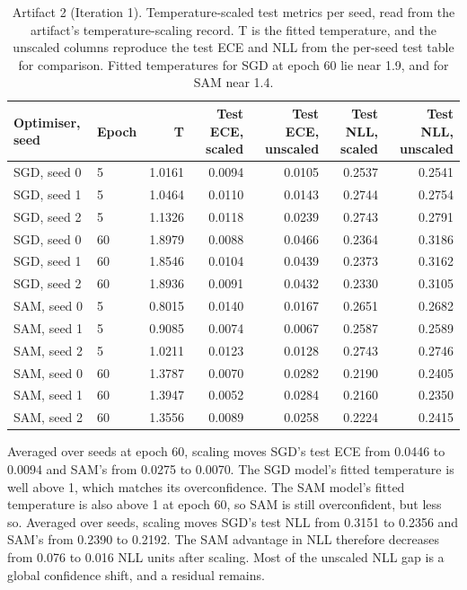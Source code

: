 \documentclass[11pt,letterpaper]{article}
\begin{document}
\begin{table}[!htbp]
\centering
\footnotesize
\caption{Artifact 2 (Iteration 1). Temperature-scaled test metrics per seed, read from the artifact's temperature-scaling record. T is the fitted temperature, and the unscaled columns reproduce the test ECE and NLL from the per-seed test table for comparison. Fitted temperatures for SGD at epoch 60 lie near 1.9, and for SAM near 1.4.}
\label{tab:tsA2}
\begin{tabular}{llrrrrr}
\toprule
Optimiser, seed & Epoch & T & Test ECE, scaled & Test ECE, unscaled & Test NLL, scaled & Test NLL, unscaled \\
\midrule
SGD, seed 0 & 5 & 1.0161 & 0.0094 & 0.0105 & 0.2537 & 0.2541 \\
SGD, seed 1 & 5 & 1.0464 & 0.0110 & 0.0143 & 0.2744 & 0.2754 \\
SGD, seed 2 & 5 & 1.1326 & 0.0118 & 0.0239 & 0.2743 & 0.2791 \\
SGD, seed 0 & 60 & 1.8979 & 0.0088 & 0.0466 & 0.2364 & 0.3186 \\
SGD, seed 1 & 60 & 1.8546 & 0.0104 & 0.0439 & 0.2373 & 0.3162 \\
SGD, seed 2 & 60 & 1.8936 & 0.0091 & 0.0432 & 0.2330 & 0.3105 \\
SAM, seed 0 & 5 & 0.8015 & 0.0140 & 0.0167 & 0.2651 & 0.2682 \\
SAM, seed 1 & 5 & 0.9085 & 0.0074 & 0.0067 & 0.2587 & 0.2589 \\
SAM, seed 2 & 5 & 1.0211 & 0.0123 & 0.0128 & 0.2743 & 0.2746 \\
SAM, seed 0 & 60 & 1.3787 & 0.0070 & 0.0282 & 0.2190 & 0.2405 \\
SAM, seed 1 & 60 & 1.3947 & 0.0052 & 0.0284 & 0.2160 & 0.2350 \\
SAM, seed 2 & 60 & 1.3556 & 0.0089 & 0.0258 & 0.2224 & 0.2415 \\
\bottomrule
\end{tabular}
\end{table}

Averaged over seeds at epoch 60, scaling moves SGD's test ECE from 0.0446 to 0.0094 and SAM's from 0.0275 to 0.0070. The SGD model's fitted temperature is well above 1, which matches its overconfidence. The SAM model's fitted temperature is also above 1 at epoch 60, so SAM is still overconfident, but less so. Averaged over seeds, scaling moves SGD's test NLL from 0.3151 to 0.2356 and SAM's from 0.2390 to 0.2192. The SAM advantage in NLL therefore decreases from 0.076 to 0.016 NLL units after scaling. Most of the unscaled NLL gap is a global confidence shift, and a residual remains.
\end{document}
